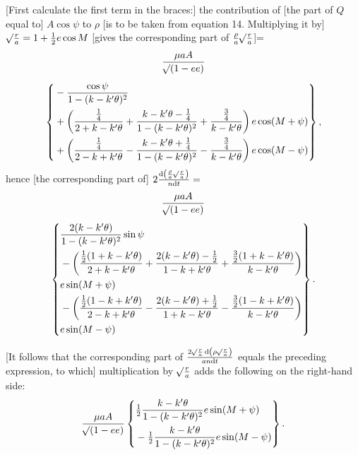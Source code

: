 [First calculate the first term in the braces:] the contribution of [the part of \(Q\) equal to] \(A\cos\psi\) to \(\rho\) \hypertarget{native-394}{}[is to be taken from equation 14. Multiplying it by] \(\mathord{{}^{}\!\surd}\frac ra=1+\tfrac12e\cos M\) [gives the corresponding part of \(\frac\rho a\mathord{{}^{}\!\surd}\frac ra\)]=
\[
\begin{gathered}
\frac{\mu aA}{\mathord{{}^{}\!\surd}(1-ee)}\\[1ex]
\left\{\begin{aligned}
&-\frac{\cos\psi}{1-(k-k'\theta)^2}\\
&+\left(\frac{\tfrac14}{2+k-k'\theta}+\frac{k-k'\theta-\tfrac14}{1-(k-k'\theta)^2}+\frac{\tfrac34}{k-k'\theta}\right)e\cos(M+\psi)\\
&+\left(\frac{\tfrac14}{2-k+k'\theta}-\frac{k-k'\theta+\tfrac14}{1-(k-k'\theta)^2}-\frac{\tfrac34}{k-k'\theta}\right)e\cos(M-\psi)
\end{aligned}\right\},
\end{gathered}
\]
\noindent hence [the corresponding part of] \(2\frac{\mathrm{d}\left(\frac\rho a\mathord{{}^{}\!\surd}\frac ra\right)}{n\mathrm{d}t}=\)
\[
\begin{gathered}
\frac{\mu aA}{\BareRoot{(1-ee)}}\\[1ex]
\left\{\begin{aligned}
&\frac{2(k-k'\theta)}{1-(k-k'\theta)^2}\sin\psi\\
&-\left(\frac{\tfrac12(1+k-k'\theta)}{2+k-k'\theta}+\frac{2(k-k'\theta)-\tfrac12}{1-k+k'\theta}+\frac{\tfrac32(1+k-k'\theta)}{k-k'\theta}\right)\\
&\hfill e\sin(M+\psi)\\
&-\left(\frac{\tfrac12(1-k+k'\theta)}{2-k+k'\theta}-\frac{2(k-k'\theta)+\tfrac12}{1+k-k'\theta}-\frac{\tfrac32(1-k+k'\theta)}{k-k'\theta}\right)\\
&\hfill e\sin(M-\psi)
\end{aligned}\right\}.
\end{gathered}
\]

[It follows that the corresponding part of \(\frac{2\mathord{{}^{}\!\surd}\frac ra\,\mathrm{d}\left(\rho\mathord{{}^{}\!\surd}\frac ra\right)}{an\mathrm{d}t}\) equals the preceding expression, to which] multiplication by \(\mathord{{}^{}\!\surd}\frac ra\) adds the following on the right-hand side:
\[
\frac{\mu aA}{\mathord{{}^{}\!\surd}(1-ee)}\left\{\begin{aligned}
&\tfrac12\frac{k-k'\theta}{1-(k-k'\theta)^2}e\sin(M+\psi)\\
&-\tfrac12\frac{k-k'\theta}{1-(k-k'\theta)^2}e\sin(M-\psi)
\end{aligned}\right\}.
\]


